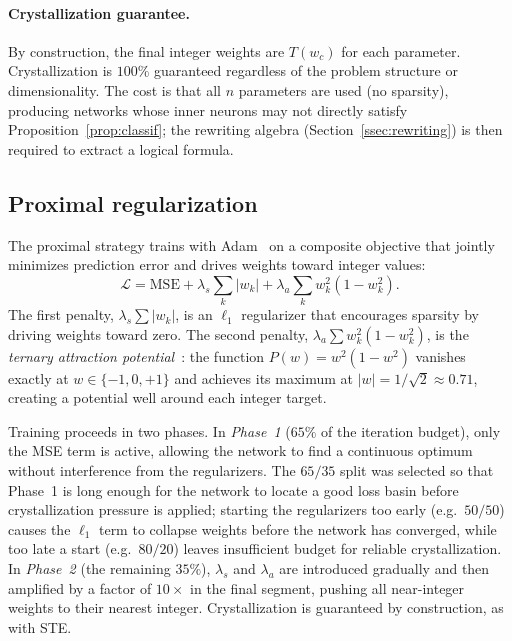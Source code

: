 \documentclass[12pt,a4paper]{article}
\begin{document}
\paragraph{Crystallization guarantee.}
By construction, the final integer weights are $T(w_c)$ for each parameter.
Crystallization is $100\%$ guaranteed regardless of the problem structure
or dimensionality.
The cost is that all $n$ parameters are used (no sparsity), producing
networks whose inner neurons may not directly satisfy
Proposition~\ref{prop:classif}; the rewriting algebra (Section~\ref{ssec:rewriting})
is then required to extract a logical formula.

\subsection{Proximal regularization}
\label{ssec:proximal}

The proximal strategy trains with Adam~\cite{kingma2015} on a composite
objective that jointly minimizes prediction error and drives weights toward
integer values:
\begin{equation}
  \mathcal{L} = \mathrm{MSE}
    + \lambda_s \sum_k |w_k|
    + \lambda_a \sum_k w_k^2(1 - w_k^2).
  \label{eq:proximal}
\end{equation}
The first penalty, $\lambda_s \sum|w_k|$, is an $\ell_1$ regularizer that
encourages sparsity by driving weights toward zero.
The second penalty, $\lambda_a \sum w_k^2(1-w_k^2)$, is the \emph{ternary
attraction potential}~\cite{parikh2014}: the function $P(w) = w^2(1-w^2)$
vanishes exactly at $w \in \{-1, 0, +1\}$ and achieves its maximum at
$|w| = 1/\sqrt{2} \approx 0.71$, creating a potential well around each
integer target.

Training proceeds in two phases.
In \emph{Phase~1} ($65\%$ of the iteration budget), only the MSE term is
active, allowing the network to find a continuous optimum without
interference from the regularizers.
The $65/35$ split was selected so that Phase~1 is long enough for the
network to locate a good loss basin before crystallization pressure is
applied; starting the regularizers too early (e.g.\ $50/50$) causes the
$\ell_1$ term to collapse weights before the network has converged, while
too late a start (e.g.\ $80/20$) leaves insufficient budget for reliable
crystallization.
In \emph{Phase~2} (the remaining $35\%$), $\lambda_s$ and $\lambda_a$ are
introduced gradually and then amplified by a factor of $10\times$ in the
final segment, pushing all near-integer weights to their nearest integer.
Crystallization is guaranteed by construction, as with STE.
\end{document}
